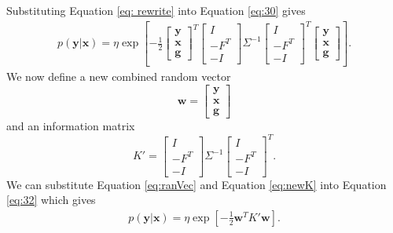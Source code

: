 \documentclass[12pt,oneside,openany,a4paper, %
afrikaans,english,
]{memoir}
\numberwithin{equation}{chapter}
\begin{document}
Substituting Equation \ref{eq: rewrite} into Equation \ref{eq:30} gives
\begin{equation}
\label{eq:32}
\begin{split}
p(\bm{y}|\bm{x}) = \eta\exp\left[-\frac{1}{2}
\begin{bmatrix}
\bm{y}\\
\bm{x}\\
\bm{g}
\end{bmatrix}^T
\begin{bmatrix}
I\\-F^T\\-I
\end{bmatrix}
\Sigma^{-1}
\begin{bmatrix}
I\\-F^T\\-I
\end{bmatrix}^T
\begin{bmatrix}
\bm{y}\\
\bm{x}\\
\bm{g}
\end{bmatrix}
\right].
\end{split}
\end{equation}
We now define a new combined random vector
\begin{equation}\label{eq:ranVec}
\bm{w} = 
\begin{bmatrix}
\bm{y}\\
\bm{x}\\
\bm{g}

\end{bmatrix}
\end{equation}
and an information matrix
\begin{equation}\label{eq:newK}
K' =
\begin{bmatrix}
I\\-F^T\\-I
\end{bmatrix}
\Sigma^{-1}
\begin{bmatrix}
I\\-F^T\\-I
\end{bmatrix}^T.
\end{equation}
We can substitute Equation \ref{eq:ranVec} and Equation \ref{eq:newK} into Equation \ref{eq:32} which gives
\begin{equation}
\label{eq:35}
\begin{split}
p(\bm{y}|\bm{x}) = \eta\exp\left[-\frac{1}{2}
\bm{w}^T
K'
\bm{w}
\right].
\end{split}
\end{equation}
\end{document}
